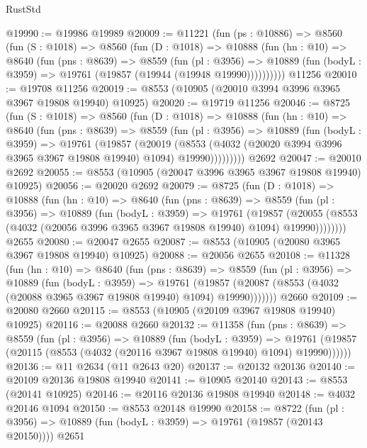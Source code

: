 \begin{lexlean}{RustStd}
\begin{coremodule}
@19990 := @19986 @19989
@20009 := @11221
    (fun (ps : @10886) =>
    @8560
      (fun (S : @1018) =>
      @8560
        (fun (D : @1018) =>
        @10888
          (fun (hn : @10) =>
          @8640
            (fun (pns : @8639) =>
            @8559
              (fun (pl : @3956) =>
              @10889 (fun (bodyL : @3959) => @19761 (@19857 (@19944 (@19948 @19990))))))))))
    @11256
@20010 := @19708 @11256
@20019 := @8553 (@10905 (@20010 @3994 @3996 @3965 @3967 @19808 @19940) @10925)
@20020 := @19719 @11256
@20046 := @8725
    (fun (S : @1018) =>
    @8560
      (fun (D : @1018) =>
      @10888
        (fun (hn : @10) =>
        @8640
          (fun (pns : @8639) =>
          @8559
            (fun (pl : @3956) =>
            @10889
              (fun (bodyL : @3959) =>
              @19761
                (@19857
                  (@20019
                    (@8553
                      (@4032 (@20020 @3994 @3996 @3965 @3967 @19808 @19940) @1094)
                      @19990)))))))))
    @2692
@20047 := @20010 @2692
@20055 := @8553 (@10905 (@20047 @3996 @3965 @3967 @19808 @19940) @10925)
@20056 := @20020 @2692
@20079 := @8725
    (fun (D : @1018) =>
    @10888
      (fun (hn : @10) =>
      @8640
        (fun (pns : @8639) =>
        @8559
          (fun (pl : @3956) =>
          @10889
            (fun (bodyL : @3959) =>
            @19761
              (@19857
                (@20055 (@8553 (@4032 (@20056 @3996 @3965 @3967 @19808 @19940) @1094) @19990))))))))
    @2655
@20080 := @20047 @2655
@20087 := @8553 (@10905 (@20080 @3965 @3967 @19808 @19940) @10925)
@20088 := @20056 @2655
@20108 := @11328
    (fun (hn : @10) =>
    @8640
      (fun (pns : @8639) =>
      @8559
        (fun (pl : @3956) =>
        @10889
          (fun (bodyL : @3959) =>
          @19761
            (@19857 (@20087 (@8553 (@4032 (@20088 @3965 @3967 @19808 @19940) @1094) @19990)))))))
    @2660
@20109 := @20080 @2660
@20115 := @8553 (@10905 (@20109 @3967 @19808 @19940) @10925)
@20116 := @20088 @2660
@20132 := @11358
    (fun (pns : @8639) =>
    @8559
      (fun (pl : @3956) =>
      @10889
        (fun (bodyL : @3959) =>
        @19761 (@19857 (@20115 (@8553 (@4032 (@20116 @3967 @19808 @19940) @1094) @19990))))))
@20136 := @11 @2634 (@11 @2643 @20)
@20137 := @20132 @20136
@20140 := @20109 @20136 @19808 @19940
@20141 := @10905 @20140
@20143 := @8553 (@20141 @10925)
@20146 := @20116 @20136 @19808 @19940
@20148 := @4032 @20146 @1094
@20150 := @8553 @20148 @19990
@20158 := @8722
    (fun (pl : @3956) => @10889 (fun (bodyL : @3959) => @19761 (@19857 (@20143 @20150))))
    @2651

\end{coremodule}
\end{lexlean}
